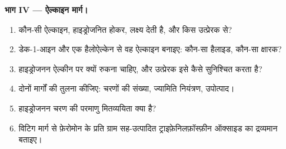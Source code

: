 \begin{problem}
\medskip
\noindent\textbf{भाग IV --- ऐल्काइन मार्ग।}
\begin{enumerate}[resume]
  \item कौन-सी ऐल्काइन, हाइड्रोजनित होकर, लक्ष्य देती है, और किस उत्प्रेरक से?
  \item डेक-1-आइन और एक हैलोऐल्केन से वह ऐल्काइन बनाइए: कौन-सा हैलाइड, कौन-सा क्षारक?
  \item हाइड्रोजनन ऐल्कीन पर क्यों रुकना चाहिए, और उत्प्रेरक इसे कैसे सुनिश्चित करता है?
  \item दोनों मार्गों की तुलना कीजिए: चरणों की संख्या, ज्यामिति नियंत्रण, उपोत्पाद।
  \item हाइड्रोजनन चरण की परमाणु मितव्ययिता क्या है?
  \item विटिग मार्ग से फ़ेरोमोन के प्रति ग्राम सह-उत्पादित ट्राइफ़ेनिलफ़ॉस्फ़ीन ऑक्साइड का द्रव्यमान
        बताइए।
\end{enumerate}
\end{problem}
